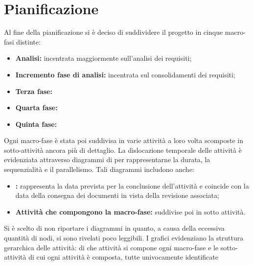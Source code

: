 \section{Pianificazione}

Al fine della pianificazione si è deciso di suddividere il progetto in cinque macro-fasi distinte:
\begin{itemize}
\item \textbf{Analisi:} incentrata maggiormente sull'analisi dei requisiti;
\item \textbf{Incremento fase di analisi:} incentrata sul consolidamenti dei requisiti;
\item \textbf{Terza fase:}
\item \textbf{Quarta fase:}
\item \textbf{Quinta fase:}
\end{itemize}
Ogni macro-fase è stata poi suddivisa in varie attività a loro volta scomposte in sotto-attività ancora più di dettaglio. La dislocazione temporale delle attività è evidenziata attraverso diagrammi di  per rappresentarne la durata, la sequenzialità e il parallelismo. Tali diagrammi includono anche:
\begin{itemize}
\item \textbf{:} rappresenta la data prevista per la conclusione dell'attività e coincide con la data della consegna dei documenti in vista della revisione associata;
\item \textbf{Attività che compongono la macro-fase:} suddivise poi in sotto attività.
\end{itemize}
Si è scelto di non riportare i diagrammi  in quanto, a causa della eccessiva quantità di nodi, si sono rivelati poco leggibili. I grafici  evidenziano la struttura gerarchica delle attività: di che attività si compone ogni macro-fase e le sotto-attività di cui ogni attività è composta, tutte univocamente identificate 

